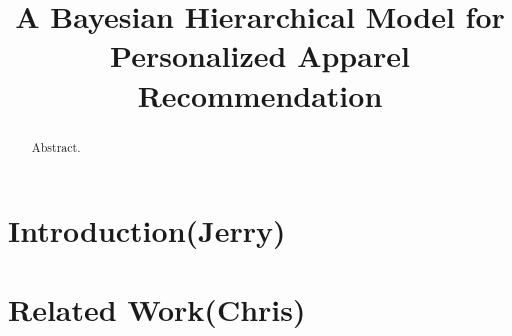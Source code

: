 
\usepackage{microtype}
\usepackage{graphicx}
\usepackage{subfigure}
\usepackage{booktabs} %
\usepackage{bm}
\usepackage{amsmath}
\usepackage{amsfonts}
\usepackage{amstext}
\usepackage[usenames,dvipsnames]{color}
\usepackage{colortbl}
\usepackage{hyperref}
\newcommand{\theHalgorithm}{\arabic{algorithm}}


\title{A Bayesian Hierarchical Model for Personalized Apparel Recommendation}

\author{} %

%






\maketitle

\begin{abstract}
Abstract.
\end{abstract}

\section{Introduction(Jerry)}
\label{sec:intro}


\section{Related Work(Chris)}
\label{sec:related}


